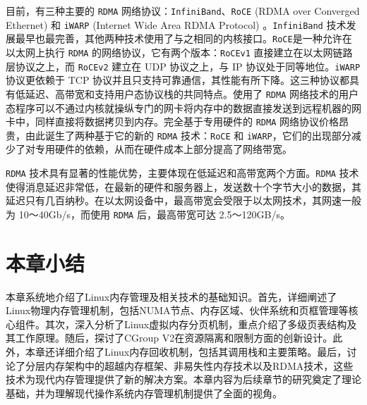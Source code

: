 目前，有三种主要的 \texttt{RDMA} 网络协议：\texttt{InfiniBand}、\texttt{RoCE} (RDMA over Converged Ethernet) 和 \texttt{iWARP} (Internet Wide Area RDMA Protocol) 。\texttt{InfiniBand} 技术发展最早也最完善，其他两种技术使用了与之相同的内核接口。\texttt{RoCE}是一种允许在以太网上执行 \texttt{RDMA} 的网络协议，它有两个版本：\texttt{RoCEv1} 直接建立在以太网链路层协议之上，而 \texttt{RoCEv2} 建立在 UDP 协议之上，与 IP 协议处于同等地位。\texttt{iWARP}协议更依赖于 TCP 协议并且只支持可靠通信，其性能有所下降。这三种协议都具有低延迟、高带宽和支持用户态协议栈的共同特点。使用了 \texttt{RDMA} 网络技术的用户态程序可以不通过内核就操纵专门的网卡将内存中的数据直接发送到远程机器的网卡中，同样直接将数据拷贝到内存。完全基于专用硬件的 \texttt{RDMA} 网络协议价格昂贵，由此诞生了两种基于它的新的 \texttt{RDMA} 技术：\texttt{RoCE} 和 \texttt{iWARP}，它们的出现部分减少了对专用硬件的依赖，从而在硬件成本上部分提高了网络带宽。

\texttt{RDMA} 技术具有显著的性能优势，主要体现在低延迟和高带宽两个方面。\texttt{RDMA} 技术使得消息延迟非常低，在最新的硬件和服务器上，发送数十个字节大小的数据，其延迟只有几百纳秒。在以太网设备中，最高带宽会受限于以太网技术，其网速一般为 10～40Gb/s，而使用 \texttt{RDMA} 后，最高带宽可达 2.5～120GB/s。

\section{本章小结}

本章系统地介绍了Linux内存管理及相关技术的基础知识。首先，详细阐述了Linux物理内存管理机制，包括NUMA节点、内存区域、伙伴系统和页框管理等核心组件。其次，深入分析了Linux虚拟内存分页机制，重点介绍了多级页表结构及其工作原理。随后，探讨了CGroup V2在资源隔离和限制方面的创新设计。此外，本章还详细介绍了Linux内存回收机制，包括其调用栈和主要策略。最后，讨论了分层内存架构中的超越内存框架、非易失性内存技术以及RDMA技术，这些技术为现代内存管理提供了新的解决方案。本章内容为后续章节的研究奠定了理论基础，并为理解现代操作系统内存管理机制提供了全面的视角。
